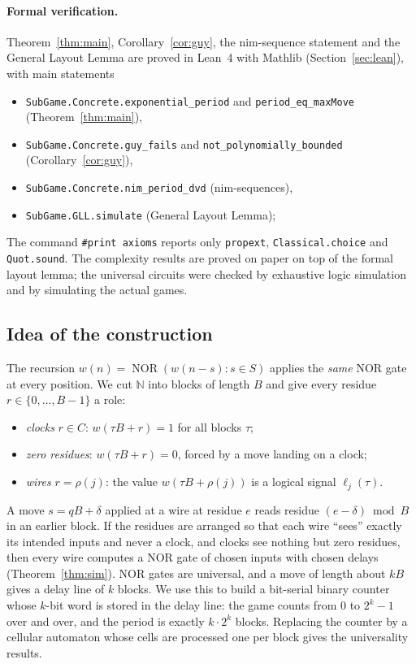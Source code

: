 \documentclass[11pt]{article}
\theoremstyle{definition}
\newcommand{\N}{\mathbb{N}}
\newcommand{\NOR}{\operatorname{NOR}}
\begin{document}
\paragraph{Formal verification.}  Theorem~\ref{thm:main}, Corollary~\ref{cor:guy}, the nim-sequence
statement and the General Layout Lemma are proved in Lean~4 with Mathlib (Section~\ref{sec:lean}), with
main statements
\begin{itemize}
\item \texttt{SubGame.Concrete.exponential\_period} and \texttt{period\_eq\_maxMove} (Theorem~\ref{thm:main}),
\item \texttt{SubGame.Concrete.guy\_fails} and \texttt{not\_polynomially\_bounded} (Corollary~\ref{cor:guy}),
\item \texttt{SubGame.Concrete.nim\_period\_dvd} (nim-sequences),
\item \texttt{SubGame.GLL.simulate} (General Layout Lemma);
\end{itemize}
{\sloppy The command \texttt{\#print axioms} reports only \texttt{propext}, \texttt{Classical.choice} and \texttt{Quot.sound}.
The complexity results are proved on paper on top of the formal layout lemma; the universal circuits
were checked by exhaustive logic simulation and by simulating the actual games.\par}

\subsection{Idea of the construction}

The recursion $w(n)=\NOR(w(n-s):s\in S)$ applies the \emph{same} NOR gate at every position.  We
cut $\N$ into blocks of length $B$ and give every residue $r\in\{0,\dots,B-1\}$ a role:
\begin{itemize}
\item \emph{clocks} $r\in C$: $w(\tau B+r)=1$ for all blocks $\tau$;
\item \emph{zero residues}: $w(\tau B+r)=0$, forced by a move landing on a clock;
\item \emph{wires} $r=\rho(j)$: the value $w(\tau B+\rho(j))$ is a logical signal $\ell_j(\tau)$.
\end{itemize}
A move $s=qB+\delta$ applied at a wire at residue $e$ reads residue $(e-\delta)\bmod B$ in an earlier
block.  If the residues are arranged so that each wire ``sees'' exactly its intended inputs and never a
clock, and clocks see nothing but zero residues, then every wire computes a NOR gate of chosen
inputs with chosen delays (Theorem~\ref{thm:sim}).  NOR gates are universal, and a move of length
about $kB$ gives a delay line of $k$ blocks.  We use this to build a bit-serial binary counter
whose $k$-bit word is stored in the delay line: the game counts from $0$ to $2^k-1$ over and over,
and the period is exactly $k\cdot 2^k$ blocks.  Replacing the counter by a cellular automaton whose
cells are processed one per block gives the universality results.
\end{document}
